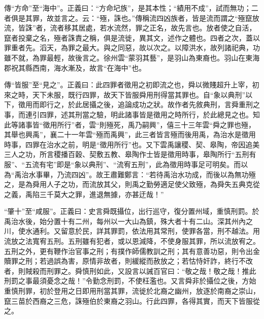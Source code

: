 {\noindent\zhuan{}\fzbyks 傳“方命”至“海中”。正義曰：“方命圮族”，是其本性；“績用不成”，試而無功；二者俱是其罪，故並言之。云：“殛，誅也。”傳稱流四凶族者，皆是流而謂之“殛竄放流，皆誅”者，流者移其居處，若水流然，罪之正名，故先言也。放者使之自活，竄者投棄之名，殛者誅責之稱，俱是流徙，異其文，述作之體也。四者之次，蓋以罪重者先。滔天，為罪之最大。與之同惡，故以次之。以障洪水，故列諸祀典，功雖不就，為罪最輕，故後言之。徐州雲“蒙羽其藝”，是羽山為東裔也。羽山在東海郡祝其縣西南，海水漸及，故言“在海中”也。 \par}

{\noindent\zhuan{}\fzbyks 傳“皆服”至“見之”。正義曰：此四罪者徵用之初即流之也，舜以微賤超升上宰，初來之時，天下未服，既行四罪，故天下皆服舜用刑得當其罪也。自“象以典刑”以下，徵用而即行之，於此居攝之後，追論成功之狀。故作者先敘典刑，言舜重刑之事，而連引四罪，述其刑當之驗，明此諸事皆是徵用之時所行，於此總見之也。知此等諸事皆“徵用所行”者，雲“則殛死，禹乃嗣興”，僖三十三年雲“舜之罪也殛，其舉也興禹”，襄二十一年雲“殛而禹興”，此三者皆言殛而後用禹，為治水是徵用時事，四罪在治水之前，明是“徵用所行”也。又下雲禹讓稷、契、皋陶，帝因追美三人之功，所言稷播百穀、契敷五教、皋陶作士皆是徵用時事，皋陶所行“五刑有服”、“五流有宅”即是“象以典刑”、“流宥五刑”，此為徵用時事足可明矣。而以為“禹治水事畢，乃流四凶”。故王肅難鄭言：“若待禹治水功成，而後以為無功殛之，是為舜用人子之功，而流放其父，則禹之勤勞適足使父致殛，為舜失五典克從之義，禹陷三千莫大之罪，進退無據，亦甚迂哉！” \par}

{\noindent\shu{}\fzkt “肇十”至“咸服”。正義曰：史言舜既攝位，出行巡守，復分置州域，重慎刑罰。於禹治水後，始分置十有二州，每州以一大山為鎮，殊大者十有二山。深其州內之川，使水通利。又留意於民，詳其罪罰，依法用其常刑，使罪各當，刑不越法。用流放之法寬宥五刑。五刑雖有犯者，或以恩減降，不使身服其罪，所以流放宥之。五刑之外，更有鞭作治官事之刑；有撲作師儒教訓之刑；其有意善功惡，則令出金贖罪之刑；若過誤為害，原情非故者，則緩縱而赦放之；若怙恃奸詐，終行不改者，則賊殺而刑罪之。舜慎刑如此，又設言以誡百官曰：“敬之哉！敬之哉！推此刑罰之事最須憂念之哉！”令勤念刑罰，不使枉濫也。又言舜非於攝位之後，方始重慎刑罪，初於登用之日即用刑當其罪，流徙於北裔之幽州，放逐於南裔之崇山，竄三苗於西裔之三危，誅殛伯於東裔之羽山。行此四罪，各得其實，而天下皆服從之。 \par}

